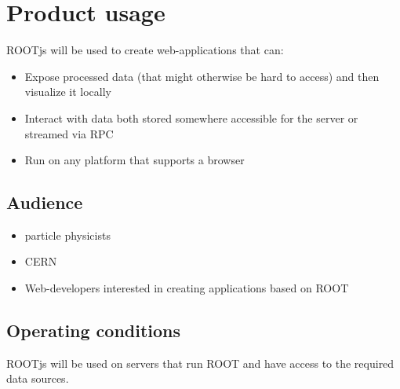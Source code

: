 \chapter{Product usage}

ROOTjs will be used to create web-applications that can:
\begin{itemize}
	\item Expose processed data (that might otherwise be hard to access) and then visualize it locally
	\item Interact with data both stored somewhere accessible for the server or streamed via RPC
	\item Run on any platform that supports a browser
\end{itemize}


\section{Audience}
\begin{itemize}
	\item particle physicists
	\item CERN
	\item Web-developers interested in creating applications based on ROOT
\end{itemize}

\section{Operating conditions}

ROOTjs will be used on servers that run ROOT and have access to the required data sources.
